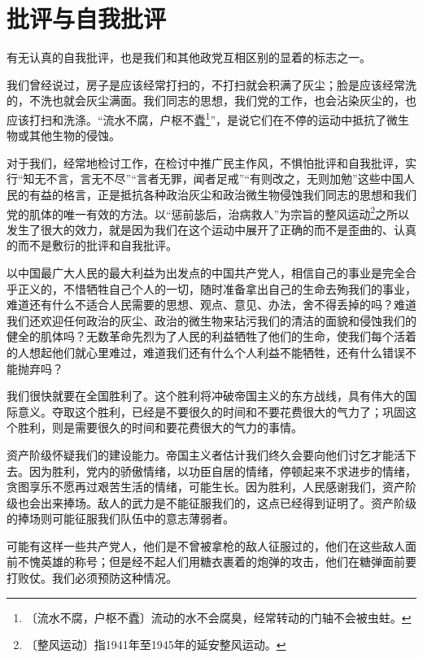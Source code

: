 \documentclass[12pt,UTF-8,openany]{ctexbook}
\begin{document}
\chapter{批评与自我批评}

\begin{normalsize}
    
    有无认真的自我批评，也是我们和其他政党互相区别的显着的标志之一。
    
    我们曾经说过，房子是应该经常打扫的，不打扫就会积满了灰尘；脸是应该经常洗的，不洗也就会灰尘满面。我们同志的思想，我们党的工作，也会沾染灰尘的，也应该打扫和洗涤。“流水不腐，户枢不蠹\footnote{〔流水不腐，户枢不蠹〕流动的水不会腐臭，经常转动的门轴不会被虫蛀。}”，是说它们在不停的运动中抵抗了微生物或其他生物的侵蚀。
    
    对于我们，经常地检讨工作，在检讨中推广民主作风，不惧怕批评和自我批评，实行“知无不言，言无不尽”“言者无罪，闻者足戒”“有则改之，无则加勉”这些中国人民的有益的格言，正是抵抗各种政治灰尘和政治微生物侵蚀我们同志的思想和我们党的肌体的唯一有效的方法。以“惩前毖后，治病救人”为宗旨的整风运动\footnote{〔整风运动〕指1941年至1945年的延安整风运动。}之所以发生了很大的效力，就是因为我们在这个运动中展开了正确的而不是歪曲的、认真的而不是敷衍的批评和自我批评。
    
    以中国最广大人民的最大利益为出发点的中国共产党人，相信自己的事业是完全合乎正义的，不惜牺牲自己个人的一切，随时准备拿出自己的生命去殉我们的事业，难道还有什么不适合人民需要的思想、观点、意见、办法，舍不得丢掉的吗？难道我们还欢迎任何政治的灰尘、政治的微生物来玷污我们的清洁的面貌和侵蚀我们的健全的肌体吗？无数革命先烈为了人民的利益牺牲了他们的生命，使我们每个活着的人想起他们就心里难过，难道我们还有什么个人利益不能牺牲，还有什么错误不能抛弃吗？
    
    我们很快就要在全国胜利了。这个胜利将冲破帝国主义的东方战线，具有伟大的国际意义。夺取这个胜利，已经是不要很久的时间和不要花费很大的气力了；巩固这个胜利，则是需要很久的时间和要花费很大的气力的事情。
    
    资产阶级怀疑我们的建设能力。帝国主义者估计我们终久会要向他们讨乞才能活下去。因为胜利，党内的骄傲情绪，以功臣自居的情绪，停顿起来不求进步的情绪，贪图享乐不愿再过艰苦生活的情绪，可能生长。因为胜利，人民感谢我们，资产阶级也会出来捧场。敌人的武力是不能征服我们的，这点已经得到证明了。资产阶级的捧场则可能征服我们队伍中的意志薄弱者。
    
    可能有这样一些共产党人，他们是不曾被拿枪的敌人征服过的，他们在这些敌人面前不愧英雄的称号；但是经不起人们用糖衣裹着的炮弹的攻击，他们在糖弹面前要打败仗。我们必须预防这种情况。
    

\end{normalsize}
\end{document}
